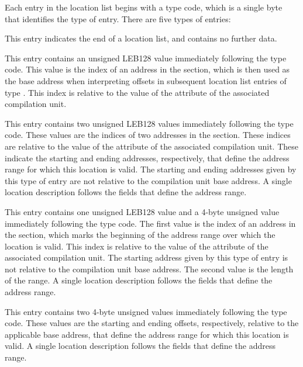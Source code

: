 Each entry in the location list
begins with a type code, which is a single byte that
identifies the type of entry. There are five types of entries:
\begin{enumerate}
\itembfnl{\DWLLEendoflistentryTARG}
This entry indicates the end of a location list, and
contains no further data.

\itembfnl{\DWLLEbaseaddressselectionentryTARG}
This entry contains an unsigned LEB128 value immediately
following the type code. This value is the index of an
address in the \dotdebugaddr{} section, which is then used as
the base address when interpreting offsets in subsequent
location list entries of type \DWLLEoffsetpairentry.
This index is relative to the value of the 
\DWATaddrbase{} attribute of the associated compilation unit.

\itembfnl{\DWLLEstartendentryTARG}
This entry contains two unsigned LEB128 values
immediately following the type code. These values are the
indices of two addresses in the \dotdebugaddr{} section.
These indices are relative to the value of the 
\DWATaddrbase{} attribute of the associated compilation unit.
These indicate the starting and ending addresses,
respectively, that define the address range for which
this location is valid. The starting and ending addresses
given by this type of entry are not relative to the
compilation unit base address. A single location
description follows the fields that define the address range.

\itembfnl{\DWLLEstartlengthentryTARG}
This entry contains one unsigned LEB128 value and a 4-byte
unsigned value immediately following the type code. The
first value is the index of an address in the \dotdebugaddr{}
section, which marks the beginning of the address range
over which the location is valid.
This index is relative to the value of the 
\DWATaddrbase{} attribute of the associated compilation unit.
The starting address given by this
type of entry is not relative to the compilation unit
base address. The second value is the
length of the range. A single location
description follows the fields that define the address range.

\itembfnl{\DWLLEoffsetpairentryTARG}
This entry contains two 4-byte unsigned values
immediately following the type code. These values are the
starting and ending offsets, respectively, relative to
the applicable base address, that define the address
range for which this location is valid. A single location
description follows the fields that define the address range.
\end{enumerate}


